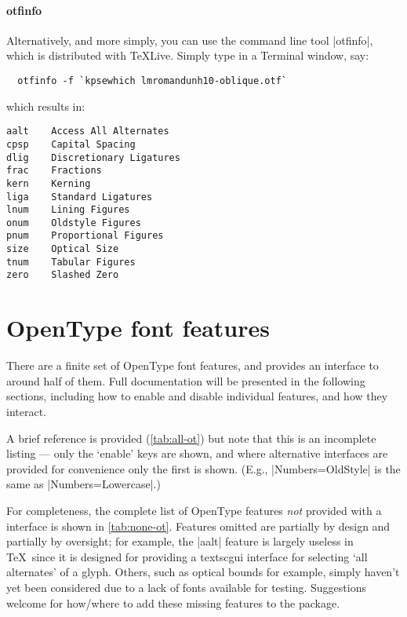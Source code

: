 \documentclass[a4paper]{l3doc}
\begin{document}
\paragraph{otfinfo}
Alternatively, and more simply, you can use the command line tool |otfinfo|, which is distributed with \TeX{}Live.
Simply type in a Terminal window, say:
\begin{Verbatim}
  otfinfo -f `kpsewhich lmromandunh10-oblique.otf`
\end{Verbatim}
which results in:
\begin{Verbatim}[frame=single]
aalt	Access All Alternates
cpsp	Capital Spacing
dlig	Discretionary Ligatures
frac	Fractions
kern	Kerning
liga	Standard Ligatures
lnum	Lining Figures
onum	Oldstyle Figures
pnum	Proportional Figures
size	Optical Size
tnum	Tabular Figures
zero	Slashed Zero
\end{Verbatim}

\section{OpenType font features}
\label{sec:ot-feat}

There are a finite set of OpenType font features, and  provides an
interface to around half of them.
Full documentation will be presented in the following sections, including how to
enable and disable individual features, and how they interact.

A brief reference is provided (\vref*{tab:all-ot}) but note that this is an incomplete
listing --- only the `enable' keys are shown, and where alternative interfaces are
provided for convenience only the first is shown.
(E.g., |Numbers=OldStyle| is the same as |Numbers=Lowercase|.)

For completeness, the complete list of OpenType features \emph{not} provided with
a  interface is shown in \vref{tab:none-ot}.
Features omitted are partially by design and partially by oversight;
for example, the |aalt| feature is largely useless in \TeX\ since it is designed
for providing a textsc{gui} interface for selecting `all alternates' of a glyph.
Others, such as optical bounds for example, simply haven't yet been considered
due to a lack of fonts available for testing.
Suggestions welcome for how/where to add these missing features to the package.

\ExplSyntaxOn
\def\allOTfeat{
  \prop_map_inline:Nn \g__fontspec_all_opentype_feature_names_prop
    { \opentypefeature{##1}{##2} }
}
\newcommand\opentypefeature[2]{
  \prop_get:NnNT \g__fontspec_OT_features_prop {#1} \tmpa
      {
        \raggedright
        \hangindent=5.2cm
        \makebox[1cm][l]{\textsc{#1}}
        \makebox[4.2cm][l]{
          \int_compare:nT { \tl_count:N \tmpa > 25 } {\ttcondensed} {\ttfamily}
          \tmpa
        }
        \textit{#2}
        \par
        \vspace{2pt}
     }
}
\ExplSyntaxOff
\end{document}

